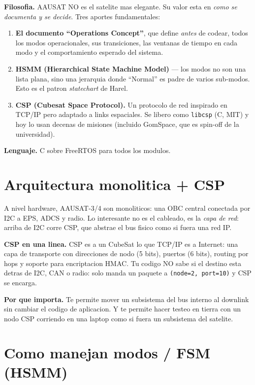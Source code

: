 \documentclass[11pt,a4paper,oneside,openright]{book}
\begin{document}
\textbf{Filosofia.} AAUSAT NO es el satelite mas elegante. Su valor
esta en \emph{como se documenta y se decide}. Tres aportes
fundamentales:

\begin{enumerate}[leftmargin=2em]
  \item \textbf{El documento ``Operations Concept''}, que define
    \emph{antes} de codear, todos los modos operacionales, sus
    transiciones, las ventanas de tiempo en cada modo y el
    comportamiento esperado del sistema.
  \item \textbf{HSMM (Hierarchical State Machine Model)} --- los modos
    no son una lista plana, sino una jerarquia donde ``Normal'' es
    padre de varios sub-modos. Esto es el patron \emph{statechart}
    de Harel.
  \item \textbf{CSP (Cubesat Space Protocol).} Un protocolo de red
    inspirado en TCP/IP pero adaptado a links espaciales. Se libero
    como \texttt{libcsp} (C, MIT) y hoy lo usan decenas de misiones
    (incluido GomSpace, que es spin-off de la universidad).
\end{enumerate}

\textbf{Lenguaje.} C sobre FreeRTOS para todos los modulos.

\section{Arquitectura monolitica + CSP}

A nivel hardware, AAUSAT-3/4 son monoliticos: una OBC central conectada
por I2C a EPS, ADCS y radio. Lo interesante no es el cableado, es la
\emph{capa de red}: arriba de I2C corre CSP, que abstrae el bus fisico
como si fuera una red IP.

\begin{tecnico}
\textbf{CSP en una linea.} CSP es a un CubeSat lo que TCP/IP es a
Internet: una capa de transporte con direcciones de nodo (5 bits),
puertos (6 bits), routing por hops y soporte para encriptacion HMAC.
Tu codigo NO sabe si el destino esta detras de I2C, CAN o radio: solo
manda un paquete a \texttt{(node=2, port=10)} y CSP se encarga.

\textbf{Por que importa.} Te permite mover un subsistema del bus
interno al downlink sin cambiar el codigo de aplicacion. Y te permite
hacer testeo en tierra con un nodo CSP corriendo en una laptop como
si fuera un subsistema del satelite.
\end{tecnico}

\section{Como manejan modos / FSM (HSMM)}
\end{document}
